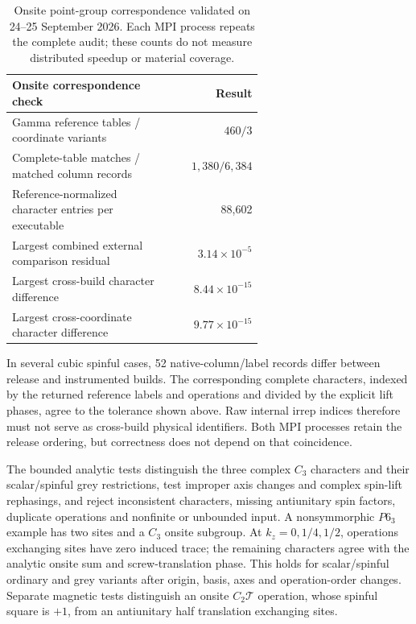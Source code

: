 \documentclass[11pt]{article}
\begin{document}
\begin{table}[htbp]
\centering\small
\begin{tabular}{p{0.62\linewidth}r}
\toprule
Onsite correspondence check & Result\\
\midrule
Gamma reference tables / coordinate variants & $460 / 3$\\
Complete-table matches / matched column records & $1,380 / 6,384$\\
Reference-normalized character entries per executable & 88,602\\
Largest combined external comparison residual & $3.14\times10^{-5}$\\
Largest cross-build character difference & $8.44\times10^{-15}$\\
Largest cross-coordinate character difference & $9.77\times10^{-15}$\\
\bottomrule
\end{tabular}
\caption{Onsite point-group correspondence validated on
24--25 September 2026. Each MPI process repeats the complete audit;
these counts do not measure distributed speedup or material coverage.}
\label{tab:onsite-reference}
\end{table}

In several cubic spinful cases, 52 native-column/label records differ
between release and instrumented builds. The corresponding complete
characters, indexed by the returned reference labels and operations
and divided by the explicit lift phases, agree to the tolerance
shown above. Raw internal irrep indices therefore must not serve as
cross-build physical identifiers. Both MPI processes retain the
release ordering, but correctness does not depend on that coincidence.

The bounded analytic tests distinguish the three complex $C_3$
characters and their scalar/spinful grey restrictions, test improper
axis changes and complex spin-lift rephasings, and reject inconsistent
characters, missing antiunitary spin factors, duplicate operations
and nonfinite or unbounded input. A nonsymmorphic $P6_3$ example has
two sites and a $C_3$ onsite subgroup. At $k_z=0,1/4,1/2$, operations
exchanging sites have zero induced trace; the remaining characters
agree with the analytic onsite sum and screw-translation phase.
This holds for scalar/spinful ordinary and grey variants after
origin, basis, axes and operation-order changes. Separate magnetic
tests distinguish an onsite $C_2\mathcal T$ operation, whose spinful
square is $+1$, from an antiunitary half translation exchanging sites.
\end{document}
